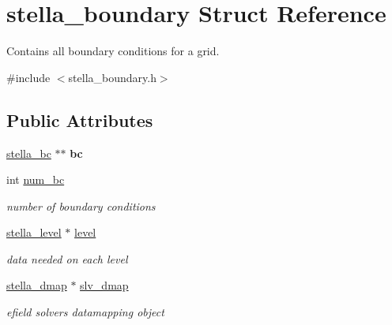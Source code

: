 \hypertarget{structstella__boundary}{}\section{stella\+\_\+boundary Struct Reference}
\label{structstella__boundary}


Contains all boundary conditions for a grid.  




{\ttfamily \#include $<$stella\+\_\+boundary.\+h$>$}

\subsection*{Public Attributes}
\begin{DoxyCompactItemize}
\item 
\mbox{\label{structstella__boundary_af712b858f672194c13f7e0ce86537f25}} 
\mbox{\hyperlink{structstella__bc__}{stella\+\_\+bc}} $\ast$$\ast$ {\bfseries bc}
\item 
\mbox{\label{structstella__boundary_a55a9f53e7fdf2f2f8022fc16aec14d30}} 
int \mbox{\hyperlink{structstella__boundary_a55a9f53e7fdf2f2f8022fc16aec14d30}{num\+\_\+bc}}
\begin{DoxyCompactList}\small\item\em number of boundary conditions \end{DoxyCompactList}\item 
\mbox{\label{structstella__boundary_a38bf65e2918d41490b536af9478d97be}} 
\mbox{\hyperlink{structstella__level}{stella\+\_\+level}} $\ast$ \mbox{\hyperlink{structstella__boundary_a38bf65e2918d41490b536af9478d97be}{level}}
\begin{DoxyCompactList}\small\item\em data needed on each level \end{DoxyCompactList}\item 
\mbox{\label{structstella__boundary_ad7a6e474dfc00d9200c215d2a2799d85}} 
\mbox{\hyperlink{structstella__dmap}{stella\+\_\+dmap}} $\ast$ \mbox{\hyperlink{structstella__boundary_ad7a6e474dfc00d9200c215d2a2799d85}{slv\+\_\+dmap}}
\begin{DoxyCompactList}\small\item\em efield solver\textquotesingle{}s datamapping object \end{DoxyCompactList}\item 
$$
\end{DoxyCompactItemize}
